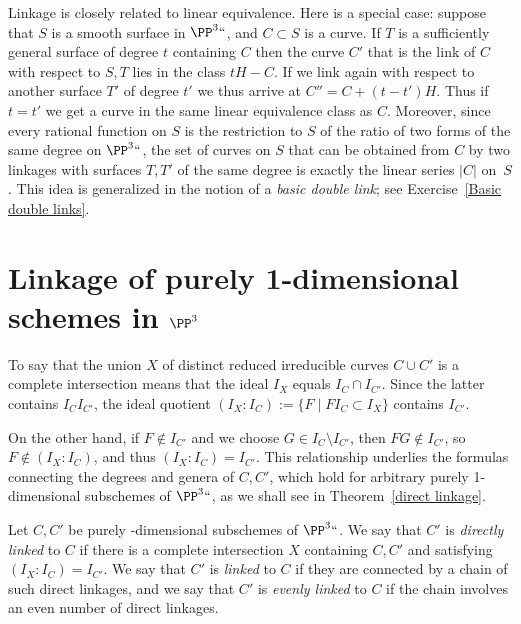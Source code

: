 \begin{remark}
Linkage is closely related to linear equivalence.
%
Here is a special case:
suppose that $S$ is a smooth surface in $\PP^3` `$, and $C\subset S$
is a curve. If $T$ is a sufficiently general surface of degree $t$
containing $C$ then the curve $C'$ that is the link of $C$ with respect
to $S,T$ lies in the class $tH-C$. If we link again with
respect to another surface $T'$ of degree $t'$ we thus arrive at $C''
= C+(t-t')H$. Thus if $t=t'$ we get a curve in the same
linear equivalence class as $C$. Moreover, since every rational function
on $S$ is the restriction to $S$ of the ratio of two forms of the same
degree on $\PP^3` `$,
the set of curves on $S$ that can be obtained from $C$ by two linkages
with surfaces $T, T'$ of the same degree is exactly the
linear series $|C|$ on~$S$. This idea is generalized in the notion of
a \emph{basic double link}; see
%
Exercise~\ref{Basic double links}.
\end{remark}

\section{Linkage of purely 1-dimensional schemes in $\PP^3$}
To say that the union $X$ of distinct reduced irreducible curves $C\cup C'$
is a complete intersection means that
the ideal $I_X $
equals
$I_C\cap I_{C'}$. Since
the latter
contains
$I_CI_{C'}$, the ideal quotient
$(I_X:I_C) := \{F \mid FI_C\subset I_X\}$
contains $I_{C'}$.

On the other hand, if $F \notin I_{C'}$ and we choose $G\in I_C\setminus
I_{C'}$, then $FG\notin I_{C'}$, so
$F\notin (I_X:I_C)$, and thus
$(I_X:I_C) = I_{C'}$.
This
relationship
underlies
the formulas connecting the degrees and genera of $C,C'$, which hold
for arbitrary purely 1-dimensional subschemes of $\PP^3` `$, as we shall see in Theorem~\ref{direct linkage}.

\begin{definition}\label{linkage def}
Let $C,C'$ be purely \1-dimensional subschemes of $\PP^3` `$. We say that
$C'$ is \emph{directly linked} to $C$ if there is a complete
intersection $X$ containing $C,C'$ and
satisfying
$(I_X:I_C) = I_{C'}$. We say that
$C'$ is \emph{linked} to $C$ if they are connected by a chain of such
%
%
direct linkages, and we say that $C'$ is \emph{evenly linked} to $C$
if the chain involves an even number of direct linkages.
\unif
\end{definition}

